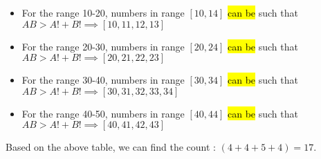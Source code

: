 \begin{itemize}
    \item For the range 10-20, numbers in range $[10,14]$ \hl{can be} such that $AB > A! + B! \implies [10,11,12,13]$
    \item For the range 20-30, numbers in range $[20,24]$ \hl{can be} such that $AB > A! + B! \implies [20,21,22,23]$
    \item For the range 30-40, numbers in range $[30,34]$ \hl{can be} such that $AB > A! + B! \implies [30,31,32,33,34]$
    \item For the range 40-50, numbers in range $[40,44]$ \hl{can be} such that $AB > A! + B! \implies [40,41,42,43]$ 
\end{itemize}

Based on the above table, we can find the count : $(4 + 4 + 5 + 4) = 17$.